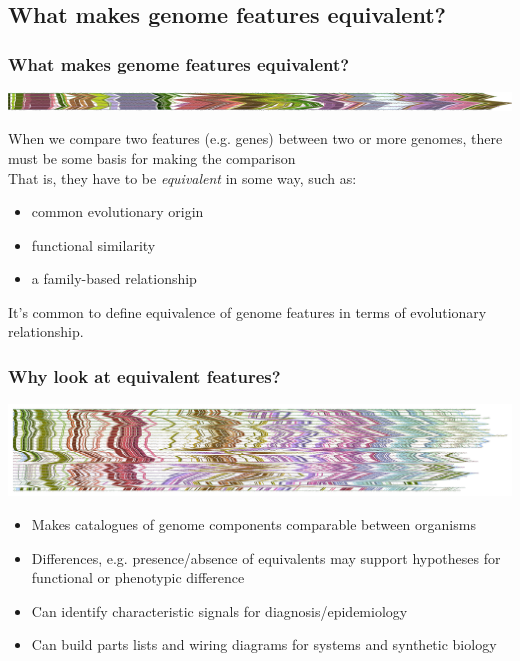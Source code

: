 
\subsection{What makes genome features equivalent?}

\begin{frame}
  \frametitle{What makes genome features equivalent?}
  \begin{center}
    \includegraphics[width=1\textwidth]{images/collinear_zeae}  
  \end{center}
  When we compare two features (e.g. genes) between two or more genomes, there must be some basis for making the comparison \\
  That is, they have to be \textit{equivalent} in some way, such as:
  \begin{itemize}
    \item common evolutionary origin
    \item functional similarity
    \item a family-based relationship
  \end{itemize}
  It's common to define equivalence of genome features in terms of evolutionary relationship.
\end{frame}

\begin{frame}
  \frametitle{Why look at equivalent features?}
  \begin{center}
    \includegraphics[width=1\textwidth]{images/dickeya_core_collinear_small}  
  \end{center}
  \begin{itemize}
    \item Makes catalogues of genome components comparable between organisms
    \item Differences, e.g. presence/absence of equivalents may support hypotheses for functional or phenotypic difference
    \item Can identify characteristic signals for diagnosis/epidemiology
    \item Can build parts lists and wiring diagrams for systems and synthetic biology
  \end{itemize}
\end{frame}

